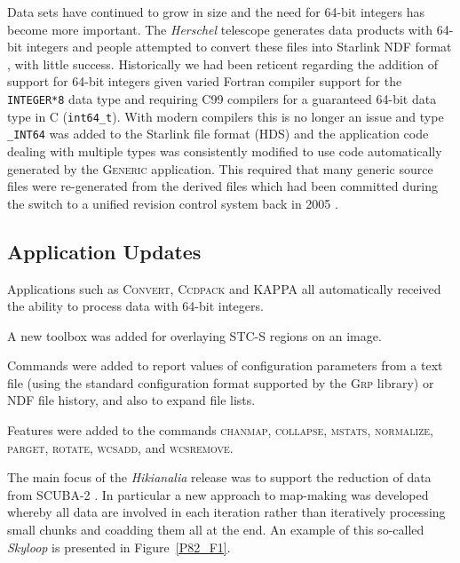 \documentclass[11pt,twoside]{article}
\begin{document}
Data sets have continued to grow in size and the need for 64-bit
integers has become more important. The \textit{Herschel} telescope
generates data products with 64-bit integers and people attempted to
convert these files into Starlink NDF format \citep[see][for an
overview of NDF]{P91_adassxxiii}, with little success. Historically we
had been reticent regarding the addition of support for 64-bit
integers given varied Fortran compiler support for the
\texttt{INTEGER*8} data type and requiring C99 compilers for a
guaranteed 64-bit data type in C (\texttt{int64\_t}). With modern
compilers this is no longer an issue and type \texttt{\_INT64} was
added to the Starlink file format (HDS) and the application code
dealing with multiple types was consistently modified to use code
automatically generated by the \textsc{Generic} application. This
required that many generic source files were re-generated from the
derived files which had been committed during the switch to a unified
revision control system back in 2005 \citep{2005ASPC..347..119G}.

\subsection*{Application Updates}

Applications such as \textsc{Convert}, \textsc{Ccdpack} and
\textsc{KAPPA} all automatically received the ability to process data
with 64-bit integers.


A new toolbox was added for overlaying STC-S regions on an image.


Commands were added to report values of configuration parameters from
a text file (using the standard configuration format supported by the
\textsc{Grp} library) or NDF file history, and also to expand file lists.

Features were added to the commands \textsc{chanmap},
\textsc{collapse}, \textsc{mstats}, \textsc{normalize},
\textsc{parget}, \textsc{rotate}, \textsc{wcsadd}, and
\textsc{wcsremove}.


The main focus of the \textit{Hikianalia} release was to support the
reduction of data from SCUBA-2
\citep{2013MNRAS.430.2545C,2013MNRAS.430.2513H}. In particular a new
approach to map-making was developed whereby all data are involved in
each iteration rather than iteratively processing small chunks and
coadding them all at the end.  An example of this so-called
\textit{Skyloop} is presented in Figure~\ref{P82_F1}.
\end{document}
